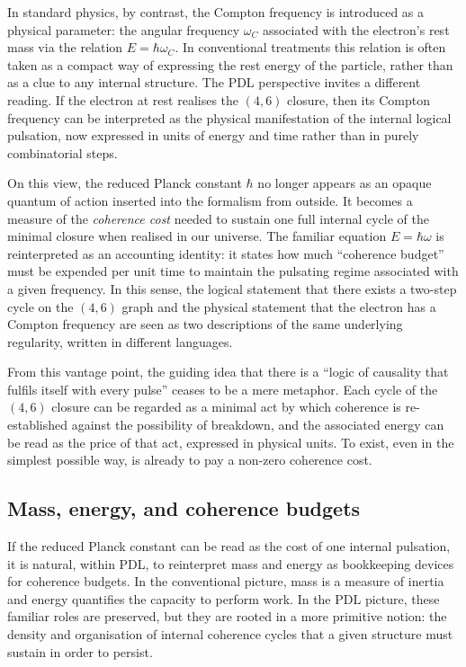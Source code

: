 \documentclass[11pt,a4paper]{article}
\theoremstyle{definition}
\begin{document}
In standard physics, by contrast, the Compton frequency is introduced as a physical parameter: the angular frequency \(\omega_C\) associated with the electron’s rest mass via the relation \(E = \hbar \omega_C\). In conventional treatments this relation is often taken as a compact way of expressing the rest energy of the particle, rather than as a clue to any internal structure. The PDL perspective invites a different reading. If the electron at rest realises the \((4,6)\) closure, then its Compton frequency can be interpreted as the physical manifestation of the internal logical pulsation, now expressed in units of energy and time rather than in purely combinatorial steps.\cite{Laubscher_EmergencePhysicalReality_2024,Laubscher_Existence_PulsatingClosure_2026}

On this view, the reduced Planck constant \(\hbar\) no longer appears as an opaque quantum of action inserted into the formalism from outside. It becomes a measure of the \emph{coherence cost} needed to sustain one full internal cycle of the minimal closure when realised in our universe.\cite{Laubscher_EmergencePhysicalReality_2024,Laubscher_PDL_Position_2024} The familiar equation \(E = \hbar \omega\) is reinterpreted as an accounting identity: it states how much ``coherence budget'' must be expended per unit time to maintain the pulsating regime associated with a given frequency. In this sense, the logical statement that there exists a two-step cycle on the \((4,6)\) graph and the physical statement that the electron has a Compton frequency are seen as two descriptions of the same underlying regularity, written in different languages.

From this vantage point, the guiding idea that there is a ``logic of causality that fulfils itself with every pulse'' ceases to be a mere metaphor. Each cycle of the \((4,6)\) closure can be regarded as a minimal act by which coherence is re-established against the possibility of breakdown, and the associated energy can be read as the price of that act, expressed in physical units.\cite{Laubscher_Existence_PulsatingClosure_2026} To exist, even in the simplest possible way, is already to pay a non-zero coherence cost.

\subsection{Mass, energy, and coherence budgets}

If the reduced Planck constant can be read as the cost of one internal pulsation, it is natural, within PDL, to reinterpret mass and energy as bookkeeping devices for coherence budgets.\cite{Laubscher_EmergencePhysicalReality_2024,Laubscher_Existence_PulsatingClosure_2026} In the conventional picture, mass is a measure of inertia and energy quantifies the capacity to perform work. In the PDL picture, these familiar roles are preserved, but they are rooted in a more primitive notion: the density and organisation of internal coherence cycles that a given structure must sustain in order to persist.
\end{document}
